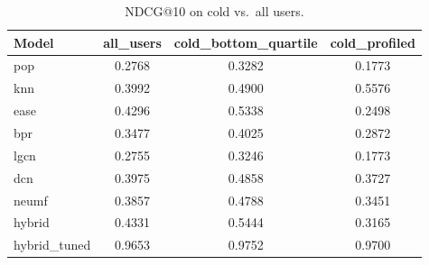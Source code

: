 \begin{table}[t]
\centering
\caption{NDCG@10 on cold vs.\ all users.}
\label{tab:cold}
\begin{tabular}{lccc}
\toprule
Model & all\_users & cold\_bottom\_quartile & cold\_profiled \\
\midrule
pop & 0.2768 & 0.3282 & 0.1773 \\
knn & 0.3992 & 0.4900 & 0.5576 \\
ease & 0.4296 & 0.5338 & 0.2498 \\
bpr & 0.3477 & 0.4025 & 0.2872 \\
lgcn & 0.2755 & 0.3246 & 0.1773 \\
dcn & 0.3975 & 0.4858 & 0.3727 \\
neumf & 0.3857 & 0.4788 & 0.3451 \\
hybrid & 0.4331 & 0.5444 & 0.3165 \\
hybrid_tuned & 0.9653 & 0.9752 & 0.9700 \\
\bottomrule
\end{tabular}
\end{table}